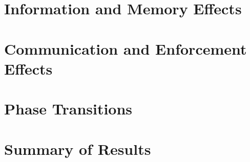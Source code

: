 \section{Information and Memory Effects}
%

\section{Communication and Enforcement Effects}

\section{Phase Transitions}
%

\section{Summary of Results}
%
